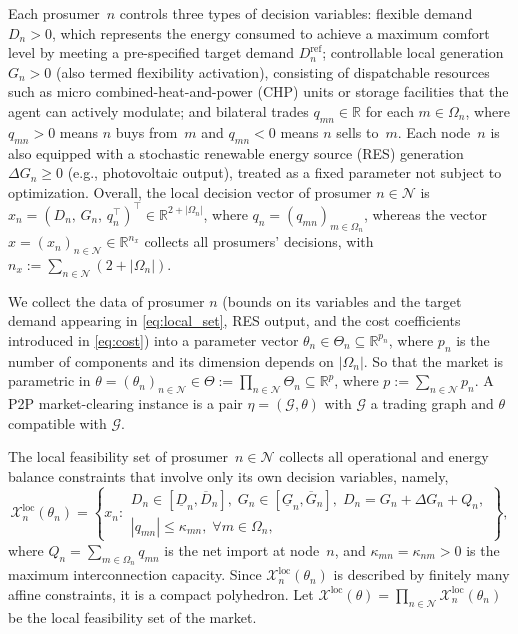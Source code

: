 \documentclass[final]{l4dc2026}
\begin{document}
Each prosumer~$n$ controls three types of decision variables: flexible demand $D_n > 0$, which represents the energy consumed to achieve a maximum comfort level by meeting a  pre-specified target demand $D_n^{\text{ref}}$; controllable local generation $G_n > 0$ (also termed flexibility activation), consisting of dispatchable resources such as micro combined-heat-and-power (CHP) units or storage facilities that the agent can actively modulate; and bilateral trades $q_{mn} \in \mathbb{R}$ for each $m \in \Omega_n$, where
$q_{mn} > 0$ means $n$ buys from~$m$ and $q_{mn} < 0$ means $n$
sells to~$m$. Each node~$n$ is also equipped with a stochastic renewable energy source (RES) generation
$\Delta G_n \geq 0$ (e.g., photovoltaic output), treated as a
fixed parameter not subject to optimization.
Overall, the local decision vector of prosumer $n \in \mathcal{N}$ is
$x_n = (D_n,\, G_n,\, q_n^\top)^\top \in \mathbb{R}^{2+|\Omega_n|}$,
where $q_n = (q_{mn})_{m \in \Omega_n}$, whereas the vector $x=(x_n)_{n\in\mathcal{N}} \in \mathbb{R}^{n_x}$ collects all prosumers' decisions, with $n_x:=\sum_{n\in\mathcal{N}}{(2+|\Omega_n|)}$.

We collect the data of prosumer $n$ (bounds on its variables and the target demand appearing in \ref{eq:local_set}, RES output, and the cost
coefficients introduced in \ref{eq:cost}) into a parameter vector $\theta_n\in\Theta_n\subseteq\mathbb{R}^{p_n}$, where $p_n$ is the number of components and its dimension depends on $|\Omega_n|$. So that the market is parametric in $\theta = (\theta_n)_{n\in\mathcal{N}} \in \Theta := \prod_{n\in\mathcal{N}} \Theta_n \subseteq \mathbb{R}^{p}$, where $p := \sum_{n\in\mathcal{N}} p_n$. A P2P market-clearing instance is a pair $\eta = (\mathcal{G}, \theta)$ with $\mathcal{G}$ a trading graph and $\theta$ compatible with $\mathcal{G}$.

The local feasibility set of prosumer~$n \in \mathcal{N}$ collects all operational and energy balance constraints that involve only its own decision
variables, namely,
%
\begin{equation}\label{eq:local_set}
  \mathcal{X}_n^{\mathrm{\text{loc}}}(\theta_n) \!=\!
  \left\{\! x_n :
  \begin{array}{l}
    D_n\in[\underline{D}_n, \overline{D}_n],\;
    G_n\in[\underline{G}_n, \overline{G}_n],\;
    D_n = G_n + \Delta G_n + Q_n,\\[2pt]
    |q_{mn}| \leq \kappa_{mn},\;\forall m \in \Omega_n,
  \end{array}
  \!\right\}\!,
\end{equation}
%
where $Q_n = \sum_{m \in \Omega_n} q_{mn}$ is the net import at
node~$n$, and $\kappa_{mn} = \kappa_{nm} > 0$ is the maximum
interconnection capacity. Since $\mathcal{X}_n^{\mathrm{\text{loc}}}(\theta_n)$ is
described by finitely many affine constraints, it is a compact polyhedron. Let $\mathcal{X}^{\text{loc}}(\theta)=\prod_{n\in\mathcal{N}} \mathcal{X}^{\text{loc}}_n(\theta_n)$ be the local feasibility set of the market.
\end{document}
